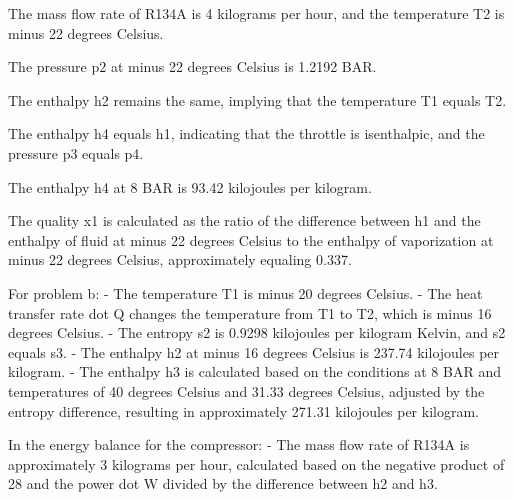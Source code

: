 The mass flow rate of R134A is 4 kilograms per hour, and the temperature T2 is minus 22 degrees Celsius.

The pressure p2 at minus 22 degrees Celsius is 1.2192 BAR.

The enthalpy h2 remains the same, implying that the temperature T1 equals T2.

The enthalpy h4 equals h1, indicating that the throttle is isenthalpic, and the pressure p3 equals p4.

The enthalpy h4 at 8 BAR is 93.42 kilojoules per kilogram.

The quality x1 is calculated as the ratio of the difference between h1 and the enthalpy of fluid at minus 22 degrees Celsius to the enthalpy of vaporization at minus 22 degrees Celsius, approximately equaling 0.337.

For problem b:
- The temperature T1 is minus 20 degrees Celsius.
- The heat transfer rate dot Q changes the temperature from T1 to T2, which is minus 16 degrees Celsius.
- The entropy s2 is 0.9298 kilojoules per kilogram Kelvin, and s2 equals s3.
- The enthalpy h2 at minus 16 degrees Celsius is 237.74 kilojoules per kilogram.
- The enthalpy h3 is calculated based on the conditions at 8 BAR and temperatures of 40 degrees Celsius and 31.33 degrees Celsius, adjusted by the entropy difference, resulting in approximately 271.31 kilojoules per kilogram.

In the energy balance for the compressor:
- The mass flow rate of R134A is approximately 3 kilograms per hour, calculated based on the negative product of 28 and the power dot W divided by the difference between h2 and h3.
